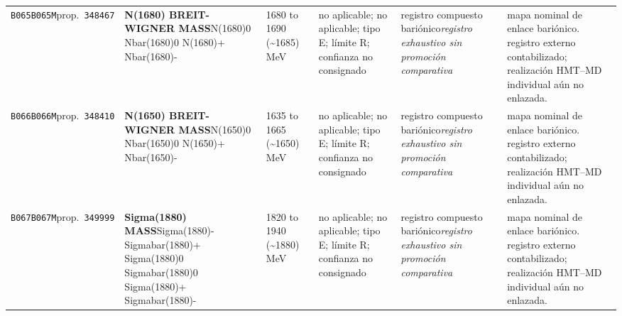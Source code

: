 \begin{landscape}
\begin{longtable}{L{1.85cm}L{4.45cm}L{2.35cm}L{4.05cm}L{3.35cm}L{7.15cm}}
\texttt{B065}\newline \texttt{B065M}\newline prop.\ \texttt{348467} & \textbf{N(1680) BREIT-WIGNER MASS}\newline N(1680)0 \textbar{}\allowbreak{} Nbar(1680)0 \textbar{}\allowbreak{} N(1680)+ \textbar{}\allowbreak{} Nbar(1680)- & 1680 to 1690 (\textasciitilde{}1685)\,MeV & no aplicable; no aplicable; tipo E; límite R; confianza no consignado & registro compuesto bariónico\newline \emph{registro exhaustivo sin promoción comparativa} & mapa nominal de enlace bariónico. registro externo contabilizado; realización HMT--MD individual aún no enlazada. \\
\texttt{B066}\newline \texttt{B066M}\newline prop.\ \texttt{348410} & \textbf{N(1650) BREIT-WIGNER MASS}\newline N(1650)0 \textbar{}\allowbreak{} Nbar(1650)0 \textbar{}\allowbreak{} N(1650)+ \textbar{}\allowbreak{} Nbar(1650)- & 1635 to 1665 (\textasciitilde{}1650)\,MeV & no aplicable; no aplicable; tipo E; límite R; confianza no consignado & registro compuesto bariónico\newline \emph{registro exhaustivo sin promoción comparativa} & mapa nominal de enlace bariónico. registro externo contabilizado; realización HMT--MD individual aún no enlazada. \\
\texttt{B067}\newline \texttt{B067M}\newline prop.\ \texttt{349999} & \textbf{Sigma(1880) MASS}\newline Sigma(1880)- \textbar{}\allowbreak{} Sigmabar(1880)+ \textbar{}\allowbreak{} Sigma(1880)0 \textbar{}\allowbreak{} Sigmabar(1880)0 \textbar{}\allowbreak{} Sigma(1880)+ \textbar{}\allowbreak{} Sigmabar(1880)- & 1820 to 1940 (\textasciitilde{}1880)\,MeV & no aplicable; no aplicable; tipo E; límite R; confianza no consignado & registro compuesto bariónico\newline \emph{registro exhaustivo sin promoción comparativa} & mapa nominal de enlace bariónico. registro externo contabilizado; realización HMT--MD individual aún no enlazada. \\

\end{longtable}
\end{landscape}
